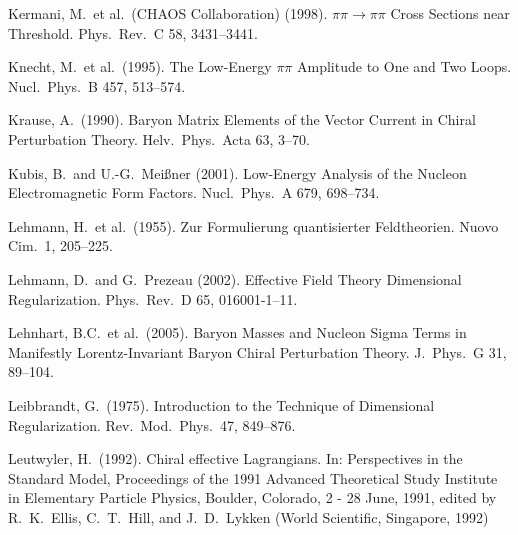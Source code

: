 \documentclass[twoside,12pt]{article}
\begin{document}
\begin{thebibliography}{}
Kermani, M.~et al.~(CHAOS Collaboration) (1998).
$\pi\pi\to\pi\pi$ Cross Sections near Threshold.
Phys.\ Rev.\  C 58, 3431--3441.

Knecht, M.~et al.~(1995).
The Low-Energy $\pi\pi$ Amplitude to One and Two Loops.
Nucl.\ Phys.\ B 457, 513--574.

Krause, A.~(1990).
Baryon Matrix Elements of the Vector Current in Chiral Perturbation Theory.
Helv.\ Phys.\ Acta 63, 3--70.

Kubis, B.~and U.-G.~Mei{\ss}ner (2001).
Low-Energy Analysis of the Nucleon Electromagnetic Form Factors.
Nucl.\ Phys.\  A 679, 698--734.

Lehmann, H.~et al.~(1955).
Zur Formulierung quantisierter Feldtheorien.
Nuovo Cim.\ 1, 205--225.

Lehmann, D.~and G.~Prezeau (2002).
Effective Field Theory Dimensional Regularization.
Phys.\ Rev.\  D 65, 016001-1--11.

Lehnhart, B.C.~et al.~(2005).
Baryon Masses and Nucleon Sigma Terms in Manifestly
Lorentz-Invariant Baryon Chiral Perturbation Theory.
J.\ Phys.\ G 31, 89--104.

Leibbrandt, G.~(1975).
Introduction to the Technique of Dimensional Regularization.
Rev.\ Mod.\ Phys.\  47, 849--876.

Leutwyler, H.~(1992).
Chiral effective Lagrangians.
In: Perspectives in the Standard Model,
Proceedings of the 1991
Advanced Theoretical Study Institute in Elementary Particle Physics,
Boulder, Colorado, 2 - 28 June, 1991,
edited by R.~K.~Ellis, C.~T.~Hill, and J.~D.~Lykken
(World Scientific, Singapore, 1992)


\end{thebibliography}
\end{document}
